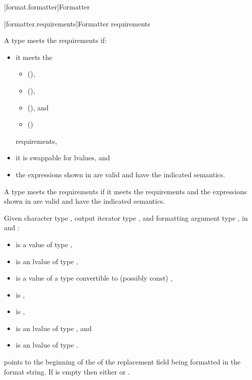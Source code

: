 [format.formatter]{Formatter}

[formatter.requirements]{Formatter requirements}

\pnum
A type  meets the  requirements if:
\begin{itemize}
\item
it meets the
\begin{itemize}
\item {} (),
\item {} (),
\item {} (), and
\item {} ()
\end{itemize}
requirements,

\item
it is swappable for lvalues, and

\item
the expressions shown in  are valid and
have the indicated semantics.
\end{itemize}

\pnum
A type  meets the  requirements
if it meets the  requirements and
the expressions shown in  are valid and
have the indicated semantics.

\pnum
Given character type , output iterator type
, and formatting argument type ,
in  and :
\begin{itemize}
\item {} is a value of type ,
\item {} is an lvalue of type ,
\item {} is a value of a type convertible to (possibly const) ,
\item {} is ,
\item {} is ,
\item {} is an lvalue of type , and
\item {} is an lvalue of type .
\end{itemize}
 points to the beginning of the
of the replacement field being formatted
in the format string.
If  is empty then either
 or
.

